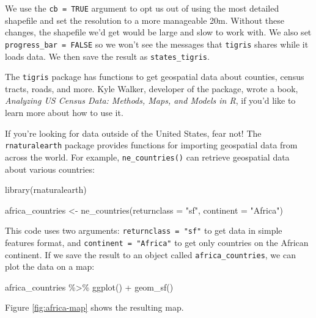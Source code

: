 \documentclass[
]{book}
\newenvironment{Shaded}{\begin{snugshade}}{\end{snugshade}}
\newcommand{\AttributeTok}[1]{\textcolor[rgb]{0.77,0.63,0.00}{#1}}
\newcommand{\FunctionTok}[1]{\textcolor[rgb]{0.00,0.00,0.00}{#1}}
\newcommand{\NormalTok}[1]{#1}
\newcommand{\OtherTok}[1]{\textcolor[rgb]{0.56,0.35,0.01}{#1}}
\newcommand{\SpecialCharTok}[1]{\textcolor[rgb]{0.00,0.00,0.00}{#1}}
\newcommand{\StringTok}[1]{\textcolor[rgb]{0.31,0.60,0.02}{#1}}
\begin{document}
We use the \texttt{cb\ =\ TRUE} argument to opt us out of using the most detailed shapefile and set the resolution to a more manageable 20m. Without these changes, the shapefile we'd get would be large and slow to work with. We also set \texttt{progress\_bar\ =\ FALSE} so we won't see the messages that \texttt{tigris} shares while it loads data. We then save the result as \texttt{states\_tigris}.

The \texttt{tigris} package has functions to get geospatial data about counties, census tracts, roads, and more. Kyle Walker, developer of the package, wrote a book, \emph{Analyzing US Census Data: Methods, Maps, and Models in R}, if you'd like to learn more about how to use it.

If you're looking for data outside of the United States, fear not! The \texttt{rnaturalearth} package provides functions for importing geospatial data from across the world. For example, \texttt{ne\_countries()} can retrieve geospatial data about various countries:

\begin{Shaded}
\begin{Highlighting}[]
\FunctionTok{library}\NormalTok{(rnaturalearth)}

\NormalTok{africa\_countries }\OtherTok{\textless{}{-}} \FunctionTok{ne\_countries}\NormalTok{(}\AttributeTok{returnclass =} \StringTok{"sf"}\NormalTok{,}
                                 \AttributeTok{continent =} \StringTok{"Africa"}\NormalTok{)}
\end{Highlighting}
\end{Shaded}

This code uses two arguments: \texttt{returnclass\ =\ "sf"} to get data in simple features format, and \texttt{continent\ =\ "Africa"} to get only countries on the African continent. If we save the result to an object called \texttt{africa\_countries}, we can plot the data on a map:

\begin{Shaded}
\begin{Highlighting}[]
\NormalTok{africa\_countries }\SpecialCharTok{\%\textgreater{}\%} 
  \FunctionTok{ggplot}\NormalTok{() }\SpecialCharTok{+}
  \FunctionTok{geom\_sf}\NormalTok{()}
\end{Highlighting}
\end{Shaded}

Figure \ref{fig:africa-map} shows the resulting map.
\end{document}
